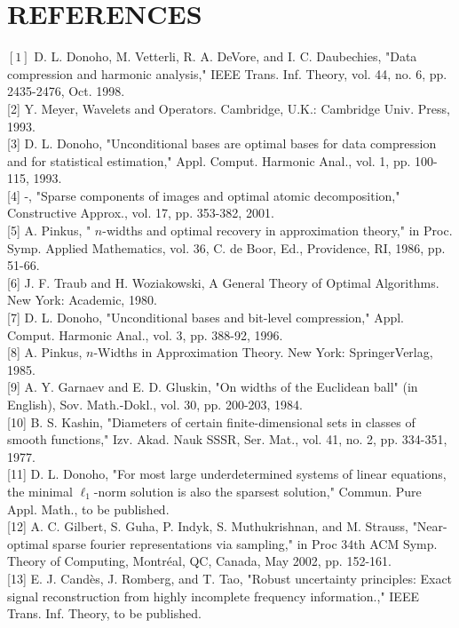 \documentclass[10pt]{article}
\begin{document}
\section*{REFERENCES}
$[1]$ D. L. Donoho, M. Vetterli, R. A. DeVore, and I. C. Daubechies, "Data compression and harmonic analysis," IEEE Trans. Inf. Theory, vol. 44, no. 6, pp. 2435-2476, Oct. 1998.\\[0pt]
[2] Y. Meyer, Wavelets and Operators. Cambridge, U.K.: Cambridge Univ. Press, 1993.\\[0pt]
[3] D. L. Donoho, "Unconditional bases are optimal bases for data compression and for statistical estimation," Appl. Comput. Harmonic Anal., vol. 1, pp. 100-115, 1993.\\[0pt]
[4] -, "Sparse components of images and optimal atomic decomposition," Constructive Approx., vol. 17, pp. 353-382, 2001.\\[0pt]
[5] A. Pinkus, " $n$-widths and optimal recovery in approximation theory," in Proc. Symp. Applied Mathematics, vol. 36, C. de Boor, Ed., Providence, RI, 1986, pp. 51-66.\\[0pt]
[6] J. F. Traub and H. Woziakowski, A General Theory of Optimal Algorithms. New York: Academic, 1980.\\[0pt]
[7] D. L. Donoho, "Unconditional bases and bit-level compression," Appl. Comput. Harmonic Anal., vol. 3, pp. 388-92, 1996.\\[0pt]
[8] A. Pinkus, $n$-Widths in Approximation Theory. New York: SpringerVerlag, 1985.\\[0pt]
[9] A. Y. Garnaev and E. D. Gluskin, "On widths of the Euclidean ball" (in English), Sov. Math.-Dokl., vol. 30, pp. 200-203, 1984.\\[0pt]
[10] B. S. Kashin, "Diameters of certain finite-dimensional sets in classes of smooth functions," Izv. Akad. Nauk SSSR, Ser. Mat., vol. 41, no. 2, pp. 334-351, 1977.\\[0pt]
[11] D. L. Donoho, "For most large underdetermined systems of linear equations, the minimal $\ell_{1}$-norm solution is also the sparsest solution," Commun. Pure Appl. Math., to be published.\\[0pt]
[12] A. C. Gilbert, S. Guha, P. Indyk, S. Muthukrishnan, and M. Strauss, "Near-optimal sparse fourier representations via sampling," in Proc 34th ACM Symp. Theory of Computing, Montréal, QC, Canada, May 2002, pp. 152-161.\\[0pt]
[13] E. J. Candès, J. Romberg, and T. Tao, "Robust uncertainty principles: Exact signal reconstruction from highly incomplete frequency information.," IEEE Trans. Inf. Theory, to be published.\\[0pt]
\end{document}
